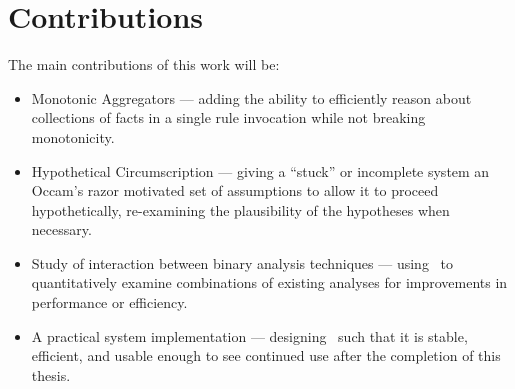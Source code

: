 \section{Contributions}
The main contributions of this work will be:
\begin{itemize}
        \item Monotonic Aggregators --- adding the ability to efficiently reason about collections of facts in a single rule invocation while not breaking monotonicity.
        \item Hypothetical Circumscription --- giving a ``stuck'' or incomplete system an Occam's razor motivated set of assumptions to allow it to proceed hypothetically, re-examining the plausibility of the hypotheses when necessary. 
        \item Study of interaction between binary analysis techniques --- using \sysname\ to quantitatively examine combinations of existing analyses for improvements in performance or efficiency.
        \item A practical system implementation --- designing \sysname\ such that it is stable, efficient, and usable enough to see continued use after the completion of this thesis.
\end{itemize}
